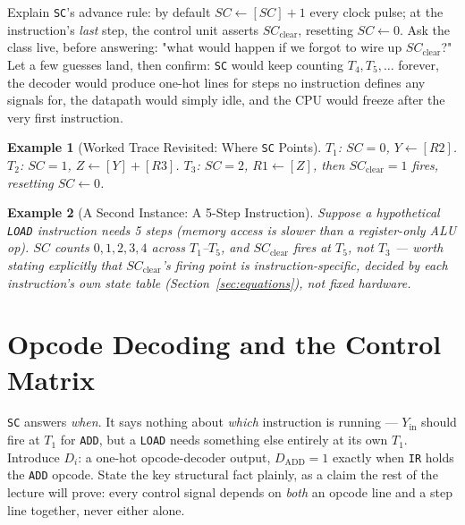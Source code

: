 \documentclass[11pt]{article}
\newtheorem{example}{Example}[section]
\begin{document}
Explain \texttt{SC}'s advance rule: by default $SC \gets [SC]+1$ every clock pulse; at the instruction's \emph{last} step, the control unit asserts $SC_{\text{clear}}$, resetting $SC \gets 0$. Ask the class live, before answering: "what would happen if we forgot to wire up $SC_{\text{clear}}$?" Let a few guesses land, then confirm: \texttt{SC} would keep counting $T_4, T_5, \dots$ forever, the decoder would produce one-hot lines for steps no instruction defines any signals for, the datapath would simply idle, and the CPU would freeze after the very first instruction.

\begin{example}[Worked Trace Revisited: Where \texttt{SC} Points]
$T_1$: $SC=0$, $Y \gets [R2]$. $T_2$: $SC=1$, $Z \gets [Y]+[R3]$. $T_3$: $SC=2$, $R1 \gets [Z]$, then $SC_{\text{clear}}=1$ fires, resetting $SC \gets 0$.
\end{example}

\begin{example}[A Second Instance: A 5-Step Instruction]
Suppose a hypothetical \texttt{LOAD} instruction needs 5 steps (memory access is slower than a register-only ALU op). $SC$ counts $0,1,2,3,4$ across $T_1$--$T_5$, and $SC_{\text{clear}}$ fires at $T_5$, not $T_3$ --- worth stating explicitly that $SC_{\text{clear}}$'s firing point is instruction-specific, decided by each instruction's own state table (Section~\ref{sec:equations}), not fixed hardware.
\end{example}

\section{Opcode Decoding and the Control Matrix}

\texttt{SC} answers \emph{when}. It says nothing about \emph{which} instruction is running --- $Y_{\text{in}}$ should fire at $T_1$ for \texttt{ADD}, but a \texttt{LOAD} needs something else entirely at its own $T_1$. Introduce $D_i$: a one-hot opcode-decoder output, $D_{\text{ADD}}=1$ exactly when \texttt{IR} holds the \texttt{ADD} opcode. State the key structural fact plainly, as a claim the rest of the lecture will prove: every control signal depends on \emph{both} an opcode line and a step line together, never either alone.
\end{document}
